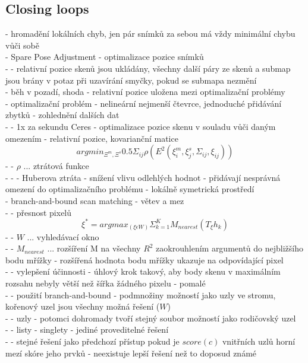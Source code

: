 \documentclass[11pt]{article}
\begin{document}
\subsection{Closing loops}
- hromadění lokálních chyb, jen pár snímků za sebou má vždy minimální chybu vůči sobě\\
- Spare Pose Adjustment - optimalizace pozice snímků\\
- - relativní pozice skenů jsou ukládány, všechny další páry ze skenů a submap jsou brány v potaz při uzavírání smyčky, pokud se submapa nezmění\\
- běh v pozadí, shoda - relativní pozice uložena mezi optimalizační problémy\\
- optimalizační problém - nelineární nejmenší čtevrce, jednoduché přidávání zbytků - zohlednění dalších dat\\
- - 1x za sekundu Ceres - optimalizace pozice skenu v souladu vůči daným omezením - relativní pozice, kovarianční matice\\
$$argmin_{\Xi^m,\Xi^s}0.5\Sigma_{ij}\rho(E^2(\xi_i^m,\xi_j^s,\Sigma_{ij},\xi_{ij}))$$
- - $\rho$ ... ztrátová funkce\\
- - - Huberova ztráta - snížení vlivu odlehlých hodnot - přidávají nesprávná omezení do optimalizačního problému - lokálně symetrická prostředí\\
- branch-and-bound scan matching - větev a mez\\
- - přesnost pixelů\\
$$\xi^*=argmax_{(\xi\epsilon W)}\Sigma_{k=1}^KM_{nearest}(T_{\xi}h_k) $$
- - $W$ ... vyhledávací okno\\
- - $M_{nearest}$ ... rozšíření M na všechny $R^2$ zaokrouhlením argumentů do nejbližšího bodu mřížky - rozšířená hodnota bodu mřížky ukazuje na odpovídající pixel\\
- - vylepšení účinnosti - úhlový krok takový, aby body skenu v maximálním rozsahu nebyly větší než šířka žádného pixelu - pomalé\\
- - použití branch-and-bound - podmnožiny možností jako uzly ve stromu, kořenový uzel jsou všechny možná řešení ($W$)\\
- - uzly - potomci dohromady tvoří stejný soubor možností jako rodičovský uzel\\
- - listy - singlety - jediné proveditelné řešení\\
- - stejné řešení jako předchozí přístup pokud je $score(c)$ vnitřních uzlů horní mezí skóre jeho prvků - neexistuje lepší řešení než to doposud známé\\
\end{document}
